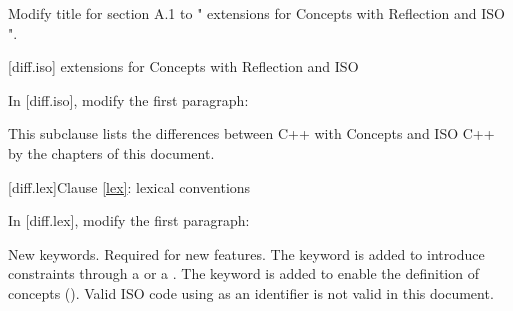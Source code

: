 \setcounter{chapter}{0}

Modify title for section A.1 to "\Cpp{} extensions for Concepts with Reflection
and ISO \CppXIV{}".

\setcounter{section}{0}
[diff.iso]{\Cpp{} extensions for Concepts with Reflection and ISO \CppXIV{}}

In {\cppstddocno} [diff.iso], modify the first paragraph:

\begin{std.txt}
This subclause lists the differences between C++ with  Concepts and ISO C++ by the chapters of this document.
\end{std.txt}

[diff.lex]{Clause \ref{lex}: lexical conventions}

In {\cppstddocno} [diff.lex], modify the first paragraph:

\begin{std.txt}
\change New keywords.
\rationale Required for new features.
The  keyword is added
to introduce constraints through a  or
a . The  keyword is
added to enable the definition of concepts ().
\effect
Valid ISO \CppXIV{} code using \added{,} 
as an identifier is not valid in this document.
\end{std.txt}
